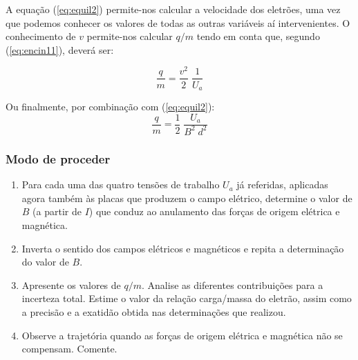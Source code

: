 \documentclass[12pt,a4paper,oneside]{paper}
\begin{document}
A equação (\ref{eq:equil2}) permite-nos calcular a velocidade dos eletrões, uma vez que podemos conhecer os valores de
todas as outras variáveis aí intervenientes. O conhecimento de $v$ permite-nos calcular $q/m$ tendo em conta que, segundo
(\ref{eq:encin11}), deverá ser:

\begin{equation*}
\label{eq:encin1}
\frac{q}{m} = \frac{v^2}{2} \; \frac{1}{U_a}
\end{equation*}

Ou finalmente, por combinação com (\ref{eq:equil2}):
\begin{equation}
	\label{eq:qmquase}
\frac{q}{m} = \frac{1}{2} \; \frac{U_a}{B^2\; d^2} 
\end{equation}

\subsubsection{\sf Modo de proceder}
\begin{enumerate}
	\item Para cada uma das quatro tensões de trabalho $U_a$ já referidas, aplicadas agora também às placas que produzem
    o campo elétrico, determine o valor de $B$ (a partir de $I$) que conduz ao anulamento das forças de origem elétrica
    e magnética.
	\item Inverta o sentido dos campos elétricos e magnéticos e repita a determinação do valor de $B$.
	\item Apresente os valores de $q/m$. Analise as diferentes contribuições para a incerteza total. Estime o valor da
    relação carga/massa do eletrão, assim como a precisão e a exatidão obtida nas determinações que realizou.
	\item  Observe  a  trajetória  quando  as  forças  de 
origem elétrica e magnética não se compensam. Comente. 
\end{enumerate}

\newpage
\end{document}
